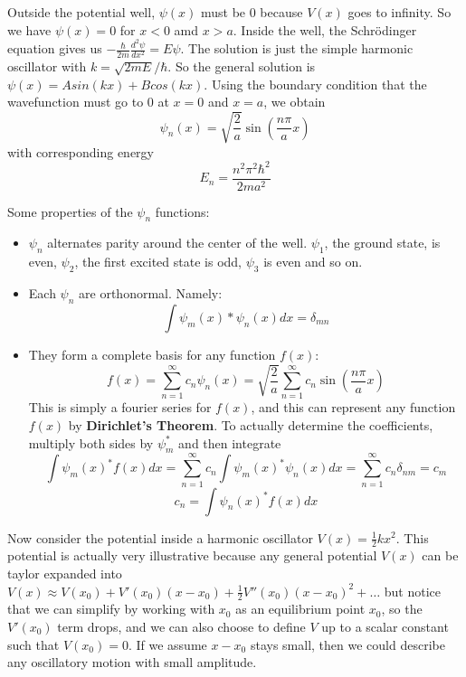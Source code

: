 \documentclass[11pt]{article}
\begin{document}
\noindent Outside the potential well, \(\psi(x)\) must be 0 because \(V(x)\) goes to infinity. So we have \(\psi(x) = 0\) for \(x < 0\) amd \(x > a\). Inside
the well, the Schr\"odinger equation gives us \(-\frac{\hbar}{2m}\frac{d^2\psi}{dx^2} = E\psi\). The solution is just the simple harmonic oscillator with 
\(k = \sqrt{2mE}/\hbar\). So the general solution is \(\psi(x) = Asin(kx) + Bcos(kx)\). Using the boundary condition that the wavefunction must go to 0 at
\(x = 0\) and \(x = a\), we obtain
\[
    \psi_n(x) = \sqrt{\frac{2}{a}}\sin{\left(\frac{n\pi}{a}x\right)}
\]
with corresponding energy 
\[
    E_n = \frac{n^2\pi^2\hbar^2}{2ma^2}
\]

\noindent Some properties of the \(\psi_n\) functions:
\begin{itemize}
    \item \(\psi_n\) alternates parity around the center of the well. \(\psi_1\), the ground state, is even, \(\psi_2\), the first excited state is odd, \(\psi_3\)
    is even and so on.
    \item Each \(\psi_n\) are orthonormal. Namely:
     \[
        \int \psi_m(x)* \psi_n(x) dx = \delta_{mn}    
    \]
    \item They form a complete basis for any function \(f(x)\):
    \[
        f(x) = \sum_{n=1}^{\infty} c_n \psi_n(x) = \sqrt{\frac{2}{a}}\sum_{n= 1}^{\infty} c_n \sin{\left(\frac{n\pi}{a}x\right)}     
    \]
    This is simply a fourier series for \(f(x)\), and this can represent any function \(f(x)\) by \textbf{Dirichlet's Theorem}.
    To actually determine the coefficients, multiply both sides by \(\psi_m^*\) and then integrate
    \[
        \int \psi_m(x)^* f(x) dx = \sum_{n=1}^{\infty} c_n\int \psi_m(x)^* \psi_n(x)dx = \sum_{n=1}^{\infty}c_n \delta_{nm} = c_m 
    \]
    \[
        c_n = \int \psi_n(x)^* f(x)dx
    \]
    
    
    
\end{itemize}
\noindent Now consider the potential inside a harmonic oscillator \( V(x) = \frac{1}{2}kx^{2} \). This potential is actually very illustrative because 
any general potential \( V(x) \) can be taylor expanded into \( V(x) \approx V(x_{0}) + V'(x_{0})(x-x_{0}) + \frac{1}{2}V''(x_{0})(x-x_{0})^{2} +\ldots\)
but notice that we can simplify by working with \( x_{0} \) as an equilibrium point \( x_{0} \), so the \( V'(x_{0}) \) term drops, and we can also choose
to define \( V \) up to a scalar constant such that \( V(x_{0}) = 0 \). If we assume \( x - x_{0} \) stays small, then we could describe any oscillatory motion
with small amplitude. 
\\
\\
\end{document}
